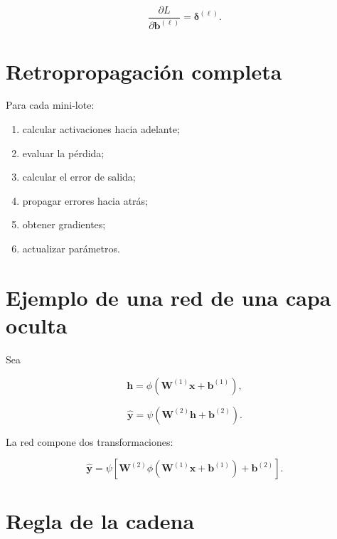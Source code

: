 \documentclass[
  spanish,
  10.5pt,
  letterpaper,
  DIV=11,
  numbers=noendperiod,
  oneside,
  open=any]{scrreprt}
\providecommand{\tightlist}{%
  \setlength{\itemsep}{0pt}\setlength{\parskip}{0pt}}
\theoremstyle{definition}
\theoremstyle{definition}
\theoremstyle{plain}
\theoremstyle{remark}
\begin{document}

\[
\frac{\partial L}
{\partial \mathbf{b}^{(\ell)}}
=
\boldsymbol{\delta}^{(\ell)}.
\]

\section*{Retropropagación completa}\label{retropropagaciuxf3n-completa}


Para cada mini-lote:

\begin{enumerate}
\def\labelenumi{\arabic{enumi}.}
\tightlist
\item
  calcular activaciones hacia adelante;
\item
  evaluar la pérdida;
\item
  calcular el error de salida;
\item
  propagar errores hacia atrás;
\item
  obtener gradientes;
\item
  actualizar parámetros.
\end{enumerate}

\section*{Ejemplo de una red de una capa
oculta}\label{ejemplo-de-una-red-de-una-capa-oculta}


Sea

\[
\mathbf{h}
=
\phi
\left(
\mathbf{W}^{(1)}\mathbf{x}
+
\mathbf{b}^{(1)}
\right),
\]

\[
\widehat{\mathbf{y}}
=
\psi
\left(
\mathbf{W}^{(2)}\mathbf{h}
+
\mathbf{b}^{(2)}
\right).
\]

La red compone dos transformaciones:

\[
\widehat{\mathbf{y}}
=
\psi
\left[
\mathbf{W}^{(2)}
\phi
\left(
\mathbf{W}^{(1)}\mathbf{x}
+
\mathbf{b}^{(1)}
\right)
+
\mathbf{b}^{(2)}
\right].
\]

\section*{Regla de la cadena}\label{regla-de-la-cadena-1}
\end{document}
